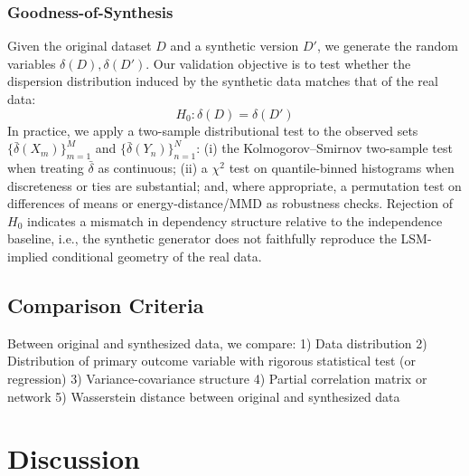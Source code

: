 \documentclass[10pt,journal]{IEEEtran}
\begin{document}
\subsubsection*{Goodness-of-Synthesis}
Given the original dataset $D$ and a synthetic version $D'$, we generate the random variables $\delta(D),\delta(D')$.
Our validation objective is to test whether the dispersion distribution induced by the synthetic data matches that of the real data:
\begin{equation}
H_0: \delta(D) = \delta(D')\label{eq:hypothesis}
\end{equation}
In practice, we apply a two-sample distributional test to the observed sets
$\{\bar\delta(X_m)\}_{m=1}^M$ and $\{\bar\delta(Y_n)\}_{n=1}^N$:
(i) the Kolmogorov--Smirnov two-sample test when treating $\bar\delta$ as continuous; 
(ii) a $\chi^2$ test on quantile-binned histograms when discreteness or ties are substantial; and, where appropriate, a permutation test on differences of means or energy-distance/MMD as robustness checks. Rejection of $H_0$ indicates a mismatch in dependency structure relative to the independence baseline, i.e., the synthetic generator does not faithfully reproduce the LSM-implied conditional geometry of the real data.

\subsection*{Comparison Criteria}
Between original and synthesized data, we compare:
1) Data distribution
2) Distribution of primary outcome variable with rigorous statistical test (or regression)
3) Variance-covariance structure 
4) Partial correlation matrix or network
5) Wasserstein distance between original and synthesized data


\section*{Discussion}
\end{document}
